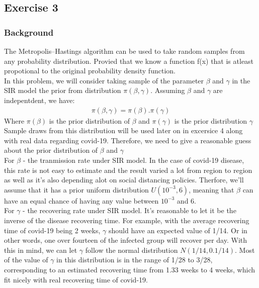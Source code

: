 \documentclass[a4paper]{article}
\begin{document}
    \subsection{Exercise 3}
    \subsubsection{Background}
    The Metropolis–Hastings algorithm can be used to take random samples from any probability distribution. Provied that we know a function f(x) that is atleast propotional to the original probability density function.
    \\
    In this problem, we will consider taking sample of the parameter $\beta$ and $\gamma$ in the SIR model the prior from distribution $\pi(\beta, \gamma)$. Assuming $\beta$ and $\gamma$ are indepentdent, we have:
    \begin{align*}
        \pi(\beta, \gamma) = \pi(\beta).\pi( \gamma)
    \end{align*}
    Where $\pi(\beta)$ is the prior distribution of $\beta$ and $\pi(\gamma)$ is the prior distribution $\gamma$
    \\
    Sample draws from this distribution will be used later on in excersice 4 along with real data regarding covid-19. Therefore, we need to give a reasonable guess about the prior distribution of $\beta$ and $\gamma$
    \\
    \indent For $\beta$ - the tranmission rate under SIR model. In the case of covid-19 disease, this rate is not easy to estimate and the result varied a lot from region to region as well as it's also depending alot on social distancing policies. Therfore, we'll assume that it has a prior uniform distribution $U(10^{-3}, 6)$, meaning that $\beta$ can have an equal chance of having any value between $10^{-3}$ and $6$.
    \\
    \indent For $\gamma$ - the recovering rate under SIR model. It's reasonable to let it be the inverse of the disease recovering time. For example, with the average recovering time of covid-19 being 2 weeks, $\gamma$ should have an expected value of 1/14. Or in other words, one over fourteen of the infected group will recover per day. With this in mind, we can let $\gamma$ follow the normal distribution $N(1/14, 0.1/14)$. Most of the value of $\gamma$ in this distribution is in the range of 1/28 to 3/28, corresponding to an estimated recovering time from 1.33 weeks to 4 weeks, which fit nicely with real recovering time of covid-19.
    \\
\end{document}
